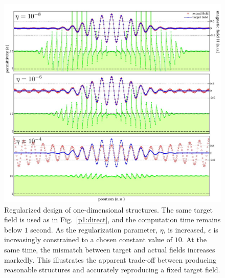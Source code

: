 \begin{figure}[htbp]\centering
\includegraphics[width=\textwidth]{p1/regularized}
\caption{Regularized design of one-dimensional structures. 
    The same target field is used as in Fig.~\ref{p1:direct}, 
        and the computation time remains below $1$ second. 
    As the regularization parameter, $\eta$, is increased, 
        $\epsilon$ is increasingly constrained to 
        a chosen constant value of $10$. 
    At the same time, the mismatch between target and actual fields 
        increases markedly. 
    This illustrates the apparent trade-off between 
        producing reasonable structures and 
        accurately reproducing a fixed target field.}
\label{regls pic}
\end{figure}




